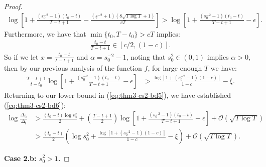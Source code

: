 \begin{proof}
\begin{align*}
     \log\left[1 + \frac{\left(s_0^{-2} -1\right)(t_0 - t)}{T - t + 1} -  \frac{(\underline{s}^{-2} + 1)\left(8\sqrt{T\log T} +1\right)}{cT}\right] > \log\left[1 + \frac{\left(s_0^{-2} -1\right)(t_0 - t)}{T - t + 1} - \epsilon\right].
\end{align*}
Furthermore, we have that $\min\{t_0,T-t_0\} > cT$ implies: 
\begin{align*}
    \frac{t_0 - t}{T - t + 1} \in [c/2, (1-c)].
\end{align*}
So if we let $x = \frac{t_0 - t}{T - t + 1}$ and $\alpha = s_0^{-2} -1$, noting that $s_0^{2}  \in (0,1)$ implies $\alpha > 0$, then by our previous analysis of the function $f$, for large enough $T$ we have:
\begin{align*}
    \frac{T-t+1}{t-t_0}\log\left[1 + \frac{\left(s_0^{-2} -1\right)(t_0 - t)}{T - t + 1} - \epsilon\right] &> \frac{\log[1 +  (s_0^{-2} -1)(1-c)]}{1-c} - \xi.
\end{align*}
Returning to our lower bound in (\ref{eq:thm3-cs2-bd5}), we have established (\ref{eq:thm3-cs2-bd6}):
\begin{align*}
    \log \frac{\Delta_{t_0}}{\Delta_t} &> \frac{(t_0 - t)\log s_0^2}{2} + \left(\frac{T - t + 1}{2}\right)\log\left[1 + \frac{\left(s_0^{-2} -1\right)(t_0 - t)}{T - t + 1} - \epsilon\right] + \mathcal{O}(\sqrt{T \log T}) \\
    &> \frac{(t_0 - t)}{2} \left(\log s_0^2 + \frac{\log[1 +  (s_0^{-2} -1)(1-c)]}{1-c} - \xi\right)  + \mathcal{O}(\sqrt{T \log T}).
\end{align*}

\textbf{Case 2.b: $s_0^2 > 1$.}


\end{proof}
